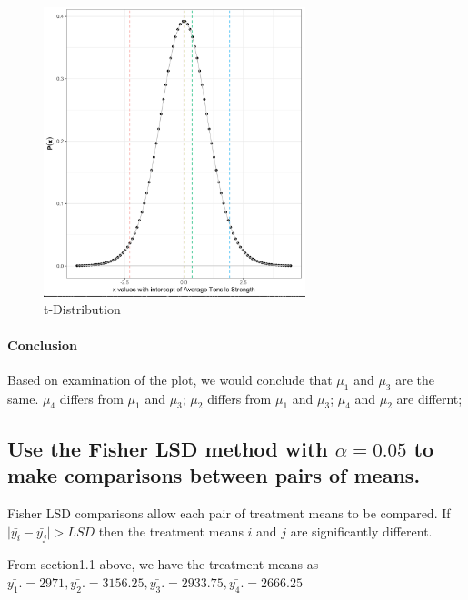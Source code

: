 \documentclass[11pt]{article}
\begin{document}
\begin{figure}[H]
    \centering
    \includegraphics[width=3.0in]{../pictures/hw2_q1_b.png}
    \caption{t-Distribution}
    \label{t-Distribution}
\end{figure}


\paragraph{Conclusion}
Based on examination of the plot, we would conclude that 
$\displaystyle \mu_1$ and $\displaystyle \mu_3$ are the same.
$\displaystyle \mu_4$ differs from $\displaystyle \mu_1$ and $\displaystyle \mu_3$;
$\displaystyle \mu_2$ differs from $\displaystyle \mu_1$ and $\displaystyle \mu_3$;
$\displaystyle \mu_4$ and $\displaystyle \mu_2$ are differnt;


\subsection{Use the Fisher LSD method with $\displaystyle \alpha=0.05$ to make comparisons between pairs of means.}

Fisher LSD comparisons allow each pair of treatment means to be compared. 
If $\displaystyle \mid \bar{y_i} - \bar{y_j} \mid > LSD$ then the treatment means  $\displaystyle i$ and $\displaystyle j$ are significantly different. 

From section1.1 above, we have the treatment means as 
$\displaystyle \bar{y_1.}=2971, \bar{y_2.}=3156.25, \bar{y_3.}=2933.75, \bar{y_4.}=2666.25$
\end{document}
